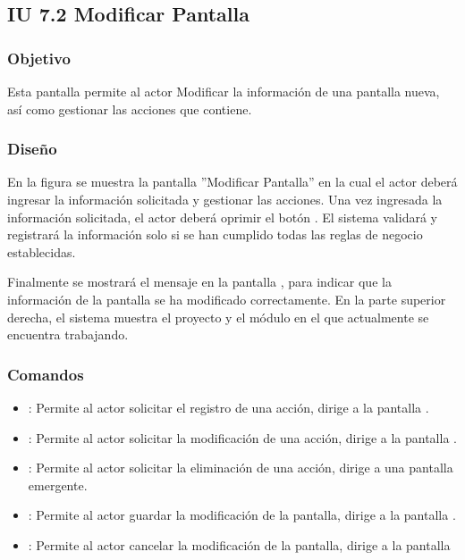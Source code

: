 \subsection{IU 7.2 Modificar Pantalla}

\subsubsection{Objetivo}
	Esta pantalla permite al actor Modificar la información de una pantalla nueva, así como gestionar las acciones que contiene.
\subsubsection{Diseño}
	En la figura  se muestra la pantalla ''Modificar Pantalla'' en la cual el actor deberá ingresar la información solicitada y gestionar las acciones.
	Una vez ingresada la información solicitada, el actor deberá oprimir el botón  . El sistema validará y registrará la información solo si se han cumplido todas las reglas de negocio establecidas.
	
	Finalmente se mostrará el mensaje  en la pantalla , para indicar que la información de la pantalla se ha modificado correctamente.
	En la parte superior derecha, el sistema muestra el proyecto y el módulo en el que actualmente se encuentra trabajando.

\subsubsection{Comandos}
\begin{itemize}
	\item {}: Permite al actor solicitar el registro de una acción, dirige a la pantalla .
	\item \editar [Modificar]: Permite al actor solicitar la modificación de una acción, dirige a la pantalla .
	\item \eliminar [Eliminar]: Permite al actor solicitar la eliminación de una acción, dirige a una pantalla emergente.
	\item {}: Permite al actor guardar la modificación de la pantalla, dirige a la pantalla .
	\item {}: Permite al actor cancelar la modificación de la pantalla, dirige a la pantalla 
\end{itemize}

